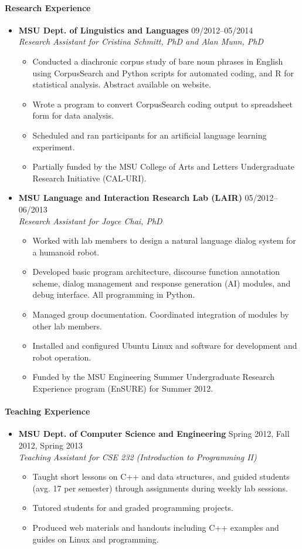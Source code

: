 \documentclass[10pt,oneside]{article}
\newenvironment{ressection}[1]{
	\paragraph{\Large#1}
	\begin{itemize}
}{
	\end{itemize}
}
\newcommand{\resbigitem}[4]{
	\item
	\textbf{#1} \hfill #2 \\
	\textit{#3} \hfill \textit{#4}
}
\newenvironment{ressubsec}[4]{
	\resbigitem{#1}{#2}{#3}{#4}
	\begin{itemize}
}{
	\end{itemize}
}
\begin{document}
\begin{ressection}{Research Experience}
    
    \begin{ressubsec}{MSU Dept. of Linguistics and Languages}
            {09/2012--05/2014}
            {Research Assistant for Cristina Schmitt, PhD and Alan Munn, PhD}
            {}
        \item{Conducted a diachronic corpus study of bare noun phrases in English using CorpusSearch and Python scripts for automated coding, and R for statistical analysis. Abstract available on website.}
        \item{Wrote a program to convert CorpusSearch coding output to spreadsheet form for data analysis.}
        \item{Scheduled and ran participants for an artificial language learning experiment.}
        \item{Partially funded by the MSU College of Arts and Letters Undergraduate Research Initiative (CAL-URI).}
    \end{ressubsec}
                    
	\begin{ressubsec}{MSU Language and Interaction Research Lab (LAIR)}
            {05/2012--06/2013}
		    {Research Assistant for Joyce Chai, PhD}
            {}
		\item{Worked with lab members to design a natural language dialog system for a humanoid robot.}
		\item{Developed basic program architecture, discourse function annotation scheme, dialog management and response generation (AI) modules, and debug interface. All programming in Python.}
		\item{Managed group documentation. Coordinated integration of modules by other lab members.}
		\item{Installed and configured Ubuntu Linux and software for development and robot operation.}
		\item{Funded by the MSU Engineering Summer Undergraduate Research Experience program (EnSURE) for Summer 2012.}
		
	\end{ressubsec}
\end{ressection}


\begin{ressection}{Teaching Experience}
	\begin{ressubsec}{MSU Dept. of Computer Science and Engineering}
            {Spring 2012, Fall 2012, Spring 2013}
        	{Teaching Assistant for CSE 232 (Introduction to Programming II)}
        	{}
		\item{Taught short lessons on C++ and data structures, and guided students (avg. 17 per semester) through assignments during weekly lab sessions.}
		\item{Tutored students for and graded programming projects.}
		\item{Produced web materials and handouts including C++ examples and guides on Linux and programming.}
	\end{ressubsec}

\end{ressection}
\end{document}
